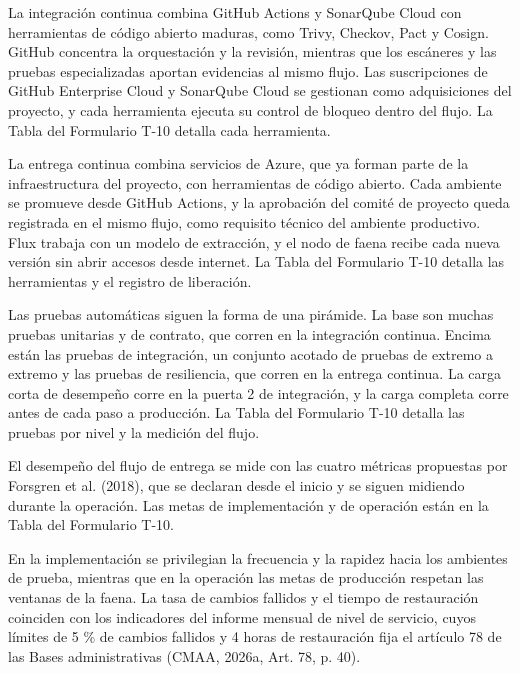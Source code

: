 \documentclass[subdoc]{../../comun/overfore}
\begin{document}
La integración continua combina GitHub Actions y SonarQube Cloud con herramientas de código abierto maduras, como Trivy, Checkov, Pact y Cosign. GitHub concentra la orquestación y la revisión, mientras que los escáneres y las pruebas especializadas aportan evidencias al mismo flujo. Las suscripciones de GitHub Enterprise Cloud y SonarQube Cloud se gestionan como adquisiciones del proyecto, y cada herramienta ejecuta su control de bloqueo dentro del flujo. La Tabla  del Formulario T-10 detalla cada herramienta.

La entrega continua combina servicios de Azure, que ya forman parte de la infraestructura del proyecto, con herramientas de código abierto. Cada ambiente se promueve desde GitHub Actions, y la aprobación del comité de proyecto queda registrada en el mismo flujo, como requisito técnico del ambiente productivo. Flux trabaja con un modelo de extracción, y el nodo de faena recibe cada nueva versión sin abrir accesos desde internet. La Tabla  del Formulario T-10 detalla las herramientas y el registro de liberación.

Las pruebas automáticas siguen la forma de una pirámide. La base son muchas pruebas unitarias y de contrato, que corren en la integración continua. Encima están las pruebas de integración, un conjunto acotado de pruebas de extremo a extremo y las pruebas de resiliencia, que corren en la entrega continua. La carga corta de desempeño corre en la puerta 2 de integración, y la carga completa corre antes de cada paso a producción. La Tabla  del Formulario T-10 detalla las pruebas por nivel y la medición del flujo.

El desempeño del flujo de entrega se mide con las cuatro métricas propuestas por Forsgren et al. (2018), que se declaran desde el inicio y se siguen midiendo durante la operación. Las metas de implementación y de operación están en la Tabla  del Formulario T-10.

En la implementación se privilegian la frecuencia y la rapidez hacia los ambientes de prueba, mientras que en la operación las metas de producción respetan las ventanas de la faena. La tasa de cambios fallidos y el tiempo de restauración coinciden con los indicadores del informe mensual de nivel de servicio, cuyos límites de 5 \% de cambios fallidos y 4 horas de restauración fija el artículo 78 de las Bases administrativas (CMAA, 2026a, Art. 78, p. 40).
\end{document}
